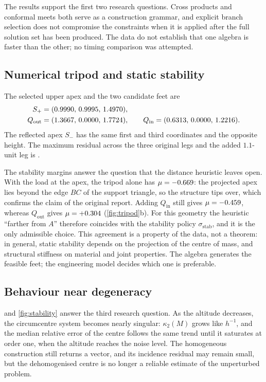 \documentclass[11pt,a4paper]{article}
\theoremstyle{plain}
\theoremstyle{definition}
\theoremstyle{remark}
\begin{document}
The results support the first two research questions. Cross products and
conformal meets both serve as a construction grammar, and explicit branch
selection does not compromise the constraints when it is applied after the full
solution set has been produced. The data do not establish that one algebra is
faster than the other; no timing comparison was attempted.

\subsection{Numerical tripod and static stability}\label{sec:tripod-results}

The selected upper apex and the two candidate feet are
\begin{equation}
  \begin{aligned}
    S_+&=(0.9990,\,0.9995,\,1.4970),\\
    Q_{\mathrm{out}}&=(1.3667,\,0.0000,\,1.7724),\qquad
    Q_{\mathrm{in}}=(0.6313,\,0.0000,\,1.2216) .
  \end{aligned}
\end{equation}
The reflected apex $S_-$ has the same first and third coordinates and the
opposite height. The maximum residual across the three original legs and the
added $1.1$-unit leg is \TripodMaximum.

The stability margins answer the question that the distance heuristic leaves
open. With the load at the apex, the tripod alone has $\mu=-0.669$: the
projected apex lies beyond the edge $BC$ of the support triangle, so the
structure tips over, which confirms the claim of the original report. Adding
$Q_{\mathrm{in}}$ still gives $\mu=-0.459$, whereas $Q_{\mathrm{out}}$ gives
$\mu=+0.304$ (\cref{fig:tripod}b). For this geometry the heuristic ``farther
from $A$'' therefore coincides with the stability policy
$\sigma_{\mathrm{stab}}$, and it is the only admissible choice. This agreement
is a property of the data, not a theorem: in general, static stability depends
on the projection of the centre of mass, and structural stiffness on material
and joint properties. The algebra generates the feasible feet; the engineering
model decides which one is preferable.

\subsection{Behaviour near degeneracy}

 and \cref{fig:stability} answer the third research
question. As the altitude decreases, the circumcentre system becomes nearly
singular: $\kappa_2(M)$ grows like $h^{-1}$, and the median relative error of the
centre follows the same trend until it saturates at order one, when the
altitude reaches the noise level. The homogeneous construction still returns a
vector, and its incidence residual may remain small, but the dehomogenised
centre is no longer a reliable estimate of the unperturbed problem.
\end{document}
